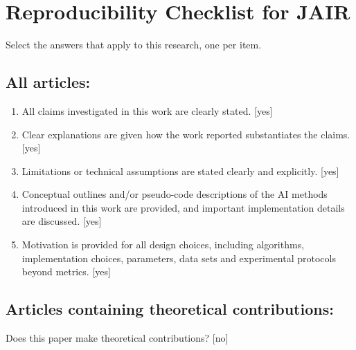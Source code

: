 \documentclass[manuscript,screen,review]{jair}
\begin{document}
\section{Reproducibility Checklist for JAIR}

Select the answers that apply to this research, one per item.

\subsection*{All articles:}
\begin{enumerate}
    \item All claims investigated in this work are clearly stated. [yes]
    \item Clear explanations are given how the work reported substantiates the claims. [yes]
    \item Limitations or technical assumptions are stated clearly and explicitly. [yes]
    \item Conceptual outlines and/or pseudo-code descriptions of the AI methods introduced in this work are provided, and important implementation details are discussed. [yes]
    \item Motivation is provided for all design choices, including algorithms, implementation choices, parameters, data sets and experimental protocols beyond metrics. [yes]
\end{enumerate}

\subsection*{Articles containing theoretical contributions:}
Does this paper make theoretical contributions? [no]
\end{document}

